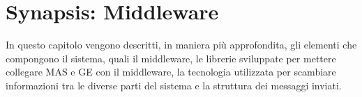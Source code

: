 \chapter{Synapsis: Middleware}
In questo capitolo vengono descritti, in maniera più approfondita, gli elementi che compongono il sistema, quali il middleware, le librerie sviluppate per mettere collegare MAS e GE con il middleware, la tecnologia utilizzata per scambiare informazioni tra le diverse parti del sistema e la struttura dei messaggi inviati.










